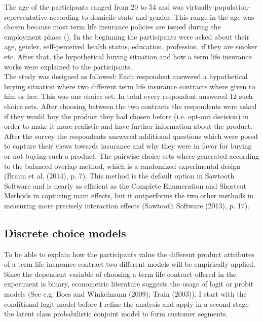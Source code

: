 \documentclass[12pt, abstracton]{article}
\begin{document}
The age of the participants ranged from 20 to 54 and was virtually population-representative according to domicile state and gender. This range in the age was chosen because most term life insurance policies are issued during the employment phase (\cite{Kirova2013}). In the beginning the participants were asked about their age, gender, self-perceived health status, education, profession, if they are smoker etc. After that, the hypothetical buying situation and how a term life insurance works were explained to the participants.\\
The study was designed as followed: Each respondent answered a hypothetical buying situation where two different term life insurance contracts where given to him or her. This was one choice set. In total every respondent answered 12 such choice sets. After choosing between the two contracts the respondents were asked if they would buy the product they had chosen before (i.e. opt-out decision) in order to make it more realistic and have further information about the product. After the survey the respondents answered additional questions which were posed to capture their views towards insurance and why they were in favor for buying or not buying such a product. The pairwise choice sets where generated according to the balanced overlap method, which is a randomized experimental design (Braun et al. (2014), p. 7). This method is the default option in Sawtooth Software and is nearly as efficient as the Complete Enumeration and Shortcut Methods in capturing main effects, but it outperforms the two other methods in measuring more precisely interaction effects (Sawtooth Software (2013), p. 17).\\ 
\subsection{Discrete choice models}
\label{DCEs}
To be able to explain how the participants value the different product attributes of a term life insurance contract two different models will be empirically applied. Since the dependent variable of choosing a term life contract offered in the experiment is binary, econometric literature suggests the usage of logit or probit models (See e.g. Boes and Winkelmann (2009); Train (2003)). I start with the conditional logit model before I refine the analysis and apply in a second stage the latent class probabilistic conjoint model to form customer segments. 
\end{document}
